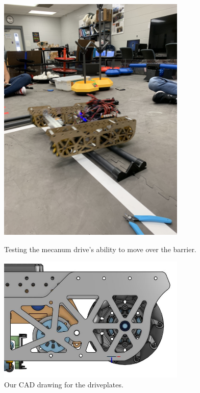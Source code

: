 \begin{figure}[ht]
\centering
\begin{minipage}[b]{.50\textwidth}
  \centering
  \includegraphics[width=0.8\textwidth]{Meetings/September/09-30-21/9-30-21_Hardware_Image3 - Nathan Forrer.JPG}
  \caption{Testing the mecanum drive's ability to move over the barrier.}
  \label{fig:pic1}
\end{minipage}%
\hfill%
\begin{minipage}[b]{.50\textwidth}
  \centering
  \includegraphics[width=0.8\textwidth]{Meetings/September/09-30-21/9-30-21_Hardware_Image4 - Nathan Forrer.JPG}
  \caption{Our CAD drawing for the driveplates.}
  \label{fig:pic2}
\end{minipage}
\end{figure}